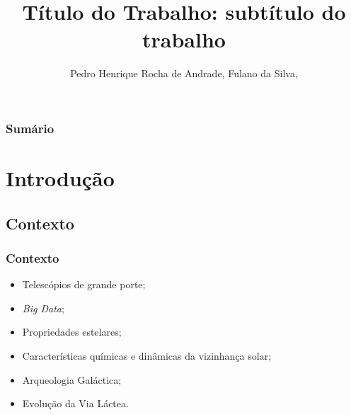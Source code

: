 \documentclass[10pt, aspectratio=169]{slidesiffmodelo}
\title{Título do Trabalho: subtítulo do trabalho}
\author{
    \orcidlink{0009-0003-6724-4640}Pedro Henrique Rocha de Andrade\inst{1}, 
    Fulano da Silva\inst{2},
}
\institute{
    \inst{1} Instituto Federal Fluminense \textit{Campus} Bom Jesus do Itabapoana\\
    \inst{2} Instituto Federal Fluminense \textit{Campus} Itaperuna\\
}
\begin{document}

\begin{frame}[t]
    \titlepage
\end{frame}

\begin{frame}[t,small]
    \frametitle{Sumário}
    \small
    \tableofcontents[hideallsubsections,sectionstyle=show]
\end{frame}

\section{Introdução}

\subsection{Contexto}
\begin{frame}
    \frametitle{Contexto}    
    \begin{textoimagem}
        \begin{itemize}
            \item Telescópios de grande porte;
            \item \textit{Big Data};
            \item Propriedades estelares;
            \item Características químicas e dinâmicas da vizinhança solar;
            \item Arqueologia Galáctica;
            \item Evolução da Via Láctea.
        \end{itemize}
        
    \colunaimagem
    \end{textoimagem}
\end{frame}
\end{document}
